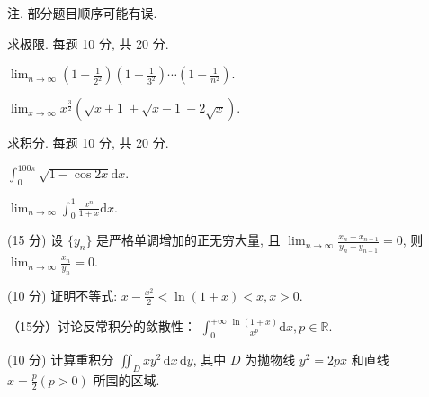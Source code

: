 注. 部分题目顺序可能有误.\par
\par{}
求极限. 每题 10 分, 共 20 分.\par
$\lim_{n\to\infty}\left(1-\frac{1}{2^{2}}\right)\left(1-\frac{1}{3^{2}}\right)\cdots\left(1-\frac{1}{n^{2}}\right).$\par
$\lim_{x\to \infty}x^{\frac{3}{2}}\left(\sqrt{x + 1} +\sqrt{x - 1} -2\sqrt{x}\right).$\par
\par{}
求积分. 每题 10 分, 共 20 分.\par
$\int_0^{100\pi}\sqrt{1 - \cos 2x}\mathrm{d}x.$\par
$\lim_{n\to \infty}\int_0^1\frac{x^n}{1 + x}\mathrm{d}x.$\par
\par{}
(15 分) 设 $\{y_{n}\}$ 是严格单调增加的正无穷大量, 且 $\lim_{n\to \infty}\frac{x_n - x_{n - 1}}{y_n - y_{n - 1}} = 0$, 则 $\lim_{n\to \infty}\frac{x_n}{y_n} = 0$.\par
\par{}
(10 分) 证明不等式: $x - \frac{x^2}{2} < \ln(1 + x) < x, x > 0$.\par
\par{}
（15分）讨论反常积分的敛散性： $\int_0^{+\infty}\frac{\ln(1 + x)}{x^p}\mathrm{d}x,p\in \mathbb{R}.$\par
\par{}
(10 分) 计算重积分 $\iint_{D} xy^{2} \, \mathrm{d}x \, \mathrm{d}y$, 其中 $D$ 为抛物线 $y^{2} = 2px$ 和直线 $x = \frac{p}{2} (p > 0)$ 所围的区域.\par

